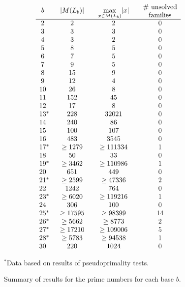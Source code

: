 \documentclass[12pt]{article}
\theoremstyle{plain}
\theoremstyle{definition}
\theoremstyle{remark}
\newcommand{\0}{\mathtt{0}}
\newcommand{\1}{\mathtt{1}}
\newcommand{\2}{\mathtt{2}}
\newcommand{\3}{\mathtt{3}}
\newcommand{\4}{\mathtt{4}}
\newcommand{\5}{\mathtt{5}}
\newcommand{\6}{\mathtt{6}}
\newcommand{\7}{\mathtt{7}}
\newcommand{\8}{\mathtt{8}}
\newcommand{\9}{\mathtt{9}}
\begin{document}
\begin{figure}\[\begin{array}{c@{\qquad}c@{\qquad}c@{\qquad}c}
b & \lvert M(L_b)\rvert & \max\limits_{x\in M(L_b)}\lvert x\rvert & \parbox{5em}{\centering\# unsolved\\families} \\ \hline
2 & 2 & 2 & 0 \\ 
3 & 3 & 3 & 0 \\ 
4 & 3 & 2 & 0 \\ 
5 & 8 & 5 & 0 \\ 
6 & 7 & 5 & 0 \\ 
7 & 9 & 5 & 0 \\ 
8 & 15 & 9 & 0 \\ 
9 & 12 & 4 & 0 \\ 
10 & 26 & 8 & 0 \\ 
11 & 152 & 45 & 0 \\ 
12 & 17 & 8 & 0 \\ 
13\mathrlap{^*} & 228 & 32021 & 0 \\ 
14 & 240 & 86 & 0 \\ 
15 & 100 & 107 & 0 \\ 
16 & 483 & 3545 & 0 \\ 
17\mathrlap{^*} & \geq1279 & \geq111334 & 1 \\ 
18 & 50 & 33 & 0 \\ 
19\mathrlap{^*} & \geq3462 & \geq110986 & 1 \\ 
20 & 651 & 449 & 0 \\ 
21\mathrlap{^*} & \geq2599 & \geq47336 & 2 \\ 
22 & 1242 & 764 & 0 \\ 
23\mathrlap{^*} & \geq6020 & \geq119216 & 1 \\ 
24 & 306 & 100 & 0 \\ 
25\mathrlap{^*} & \geq17595 & \geq98399 & 14 \\ 
26\mathrlap{^*} & \geq5662 & \geq8773 & 2 \\ 
27\mathrlap{^*} & \geq17210 & \geq109006 & 5 \\ 
28\mathrlap{^*} & \geq5783 & \geq94538 & 1 \\
30 & 220 & 1024 & 0
\end{array}\]
\begin{center}$^*$Data based on results of pseudoprimality tests.\end{center}
\caption{Summary of results for the prime numbers for each base $b$.}
\label{resultsfig}
\end{figure}
\end{document}
